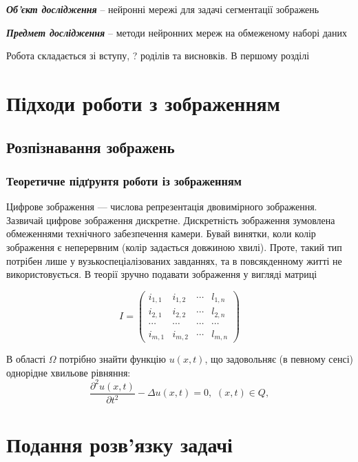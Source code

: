 \documentclass[a4paper,12pt,titlepage]{article}
\begin{document}
\textbf{\textit{Об'єкт дослідження}} -- нейронні мережі для задачі сегментації зображень

\textbf{\textit{Предмет дослідження }} -- методи нейронних мереж на обмеженому наборі даних 

Робота складається зі вступу, ? роділів та висновків.
В першому розділі 

\newpage
\section{ Підходи роботи з зображенням }
\subsection{ Розпізнавання зображень }
\subsubsection{ Теоретичне підґрунтя роботи із зображенням }

Цифрове зображення — числова репрезентація двовимірного зображення. Зазвичай цифрове зображення дискретне. Дискретність зображення зумовлена обмеженнями технічного забезпечення камери. Бувай винятки, коли колір зображення є неперервним (колір задається довжиною хвилі). Проте, такий тип потрібен лише у вузькоспеціалізованих завданнях, та в повсякденному житті не використовується. В теорії зручно подавати зображення у вигляді матриці

\begin{equation}
    I = \left( 
\begin{matrix}
	i_{1,1} & i_{1,2} & \cdots & l_{1,n} \\
	i_{2,1} & i_{2,2} & \cdots & l_{2,n} \\
	\cdots &  \cdots & \cdots & \cdots \\
	i_{m,1} & i_{m,2} & \cdots & l_{m,n} 
\end{matrix}	 
  \right)
 
\end{equation}

В області $\Omega$ потрібно знайти функцію $u(x,t)$, що задовольняє (в певному сенсі) однорідне хвильове рівняння:
\begin{equation}\label{eq}
\frac{\partial^2u(x,t)}{\partial t^2}-\Delta u(x,t)=0, \,\, (x,t)\in Q,
\end{equation} 

\newpage

\section{Подання розв'язку задачі}
\end{document}
